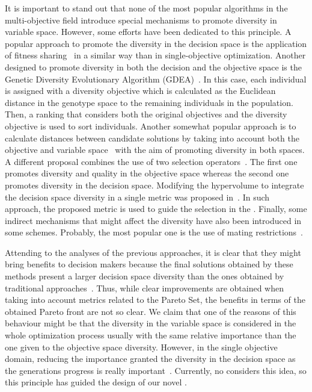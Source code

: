 It is important to stand out that none of the most popular algorithms in the multi-objective field introduce special mechanisms to promote diversity in variable space.
%
However, some efforts have been dedicated to this principle.
%
A popular approach to promote the diversity in the decision space is the application of fitness sharing~\cite{Joel:NPGA} in a similar way than in single-objective optimization.
%
Another \MOEA{} designed to promote diversity in both the decision and the objective space is the Genetic
Diversity Evolutionary Algorithm (GDEA)~\cite{toffolo2003genetic}.
%
In this case, each individual is assigned with a diversity objective which is calculated as the
Euclidean distance in the genotype space to the remaining individuals in the population.
%
Then, a ranking that considers both the original objectives and the diversity objective is used
to sort individuals.
%
Another somewhat popular approach is to calculate distances between candidate solutions by taking
into account both the objective and variable space~\cite{deb2005omni,shir2009enhancing} with the aim
of promoting diversity in both spaces.
%
A different proposal combines the use of two selection operators~\cite{chan2005evolutionary}.
%
The first one promotes diversity and quality in the objective space whereas the second one promotes diversity in the decision space.
%
Modifying the hypervolume to integrate the decision space diversity in a single metric was proposed in~\cite{ulrich2010integrating}.
%
In such approach, the proposed metric is used to guide the selection in the \MOEA{}.
%
Finally, some indirect mechanisms that might affect the diversity have also been introduced in some schemes.
%
Probably, the most popular one is the use of mating restrictions~\cite{Joel:STUDY_MATTING_RESTRICTION,Joel:MOEAD_AMS}.

Attending to the analyses of the previous approaches, it is clear that they might bring benefits to decision makers
because the final solutions obtained by these methods present a larger decision space diversity than the ones obtained
by traditional approaches~\cite{deb2005omni, rudolph2007capabilities}.
%
Thus, while clear improvements are obtained when taking into account metrics related to the Pareto Set, the benefits in terms of the 
obtained Pareto front are not so clear.
%
We claim that one of the reasons of this behaviour might be that the diversity in the variable space is considered in the whole optimization process
usually with the same relative importance than the one given to the objective space diversity.
%
However, in the single objective domain, reducing the importance granted the diversity in the decision space as the generations progress is really important~\cite{Joel:MULTI_DYNAMIC}.
%
Currently, no \MOEA{} considers this idea, so this principle has guided the design of our novel \MOEA{}.
